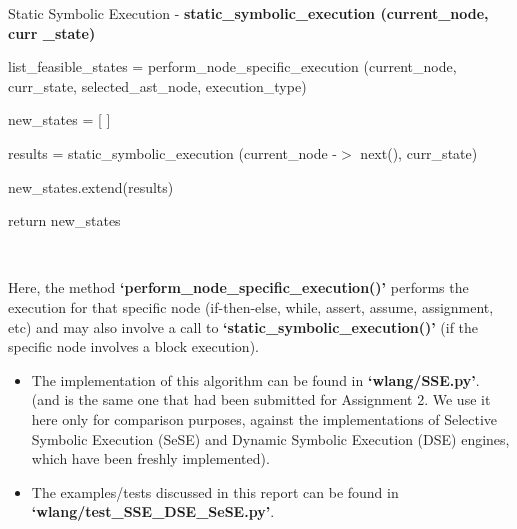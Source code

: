 \documentclass[11pt]{llncs}
\begin{document}
			\begin{algorithm}[H]
				\caption{Static Symbolic Execution  - \textbf{ static\_symbolic\_execution (current\_node, curr \_state)}}  \label{algorithm_1}
				
				\DontPrintSemicolon
				\SetAlgoLined
	
				\vspace{2mm}
				
				\;
				
	
				list\_feasible\_states = perform\_node\_specific\_execution (current\_node, curr\_state, selected\_ast\_node, execution\_type)
	
				\vspace{2mm}
	
				 {
				      new\_states = [ ]

					\vspace{2mm}
	
				        {
					results = static\_symbolic\_execution (current\_node -$>$ next(), curr\_state)
	
					\vspace{1mm}
	
					new\_states.extend(results)
				      }

					\vspace{2mm}
				
				       return new\_states
				}
			\end{algorithm}

		~

		Here, the method \textbf{‘perform\_node\_specific\_execution()’ }performs the execution for that specific node (if-then-else, while, assert, assume, assignment, etc) and may also involve a call to \textbf{‘static\_symbolic\_execution()’}  (if the specific node involves a block execution).


		\begin{itemize}
			\item The implementation of this algorithm can be found in \textbf{‘wlang/SSE.py’}. (and is the same one that had been submitted for Assignment 2. We use it here only for comparison purposes, against the implementations of Selective Symbolic Execution (SeSE) and Dynamic Symbolic Execution (DSE) engines, which have been freshly implemented).
			\item The examples/tests discussed in this report can be found in \textbf{‘wlang/test\_SSE\_DSE\_SeSE.py’}.
		\end{itemize}
\end{document}
